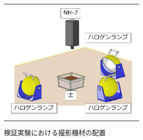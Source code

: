 \begin{figure}[p]
	\begin{center}
		\begin{tabular}{c}

			\begin{minipage}[t]{\linewidth}
			\hspace{3cm}\includegraphics[width=7cm]{./Ch3_SoilTypeDiscrimination/Fig/discrimination_experiment_setting_compressed.pdf}
			\caption{検証実験における撮影機材の配置}\label{fig:discrimination_experiment_setting}
			\vspace{2cm}
			\end{minipage}

		\end{tabular}
	\end{center}
\end{figure}


